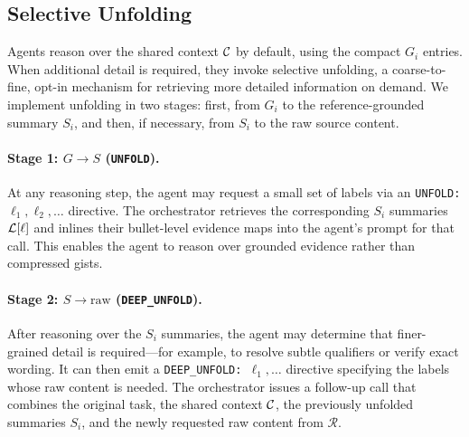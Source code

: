 
\subsection{Selective Unfolding}
\label{sec:unfold}
Agents reason over the shared context $\mathcal{C}$ by default, using the compact $G_i$ entries. When additional detail is required, they invoke {selective unfolding}, a coarse-to-fine, opt-in mechanism for retrieving more detailed information on demand. We implement unfolding in two stages: first, from $G_i$ to the reference-grounded summary $S_i$, and then, if necessary, from $S_i$ to the raw source content.


\paragraph{Stage 1: $G \rightarrow S$ (\texttt{UNFOLD}).}
At any reasoning step, the agent may request a small set of labels via an \texttt{UNFOLD: $\ell_1, \ell_2, \ldots$} directive. The orchestrator retrieves the corresponding $S_i$ summaries $\mathcal{L}[\ell]$ and inlines their bullet-level evidence maps into the agent’s prompt for that call. This enables the agent to reason over grounded evidence rather than compressed gists.

\paragraph{Stage 2: $S \rightarrow \text{raw}$ (\texttt{DEEP\_UNFOLD}).}
After reasoning over the $S_i$ summaries, the agent may determine that finer-grained detail is required---for example, to resolve subtle qualifiers or verify exact wording. It can then emit a \texttt{DEEP\_UNFOLD: $\ell_1, \ldots$} directive specifying the labels whose raw content is needed. The orchestrator issues a follow-up call that combines the original task, the shared context $\mathcal{C}$, the previously unfolded summaries $S_i$, and the newly requested raw content from $\mathcal{R}$.

